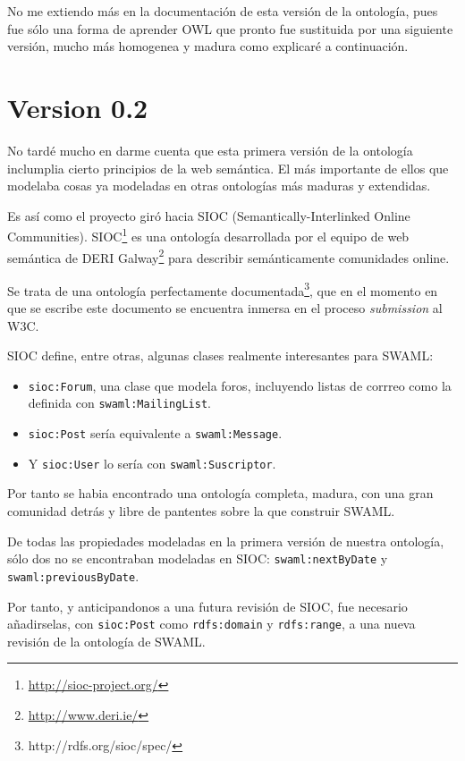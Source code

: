 No me extiendo más en la documentación de esta versión de la ontología, pues
fue sólo una forma de aprender OWL que pronto fue sustituida por una siguiente
versión, mucho más homogenea y madura como explicaré a continuación.


\section{Version 0.2}\label{sec:ont:0.2}

No tardé mucho en darme cuenta que esta primera versión de la ontología inclumplia
cierto principios de la web semántica. El más importante de ellos que modelaba
cosas ya modeladas en otras ontologías más maduras y extendidas.

Es así como el proyecto giró hacia SIOC\cite{Breslin2005} (Semantically-Interlinked 
Online Communities). SIOC\footnote{\url{http://sioc-project.org/}} es una ontología 
desarrollada por el equipo de web semántica de DERI Galway\footnote{\url{http://www.deri.ie/}} 
para describir semánticamente comunidades online.

Se trata de una ontología perfectamente documentada\footnote{http://rdfs.org/sioc/spec/},
que en el momento en que se escribe este documento se encuentra inmersa en el 
proceso \emph{submission} al W3C.

SIOC define, entre otras, algunas clases realmente interesantes para SWAML:

\begin{itemize}
  \item \texttt{sioc:Forum}, una clase que modela foros, incluyendo listas de corrreo
	como la definida con \texttt{swaml:MailingList}.
  \item \texttt{sioc:Post} sería equivalente a \texttt{swaml:Message}.
  \item Y \texttt{sioc:User} lo sería con \texttt{swaml:Suscriptor}.
\end{itemize}

Por tanto se habia encontrado una ontología completa, madura, con una gran 
comunidad detrás y libre de pantentes sobre la que construir SWAML.

De todas las propiedades modeladas en la primera versión de nuestra ontología,
sólo dos no se encontraban modeladas en SIOC: \texttt{swaml:nextByDate} y
\texttt{swaml:previousByDate}. 

Por tanto, y anticipandonos a una futura revisión de SIOC, fue necesario añadirselas, 
con \texttt{sioc:Post} como \texttt{rdfs:domain} y \texttt{rdfs:range}, a una 
nueva revisión de la ontología de SWAML.

